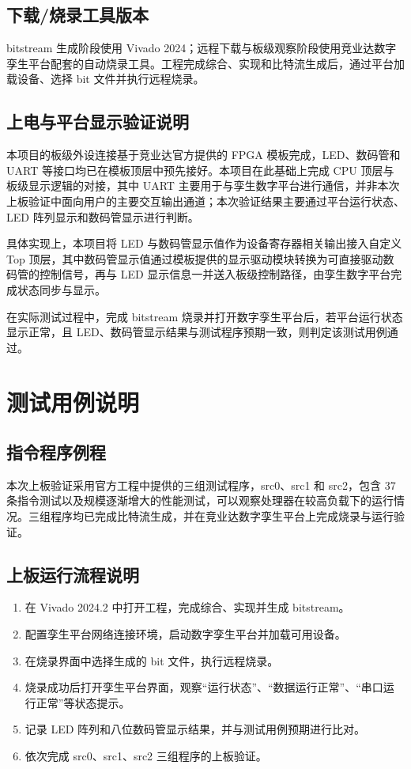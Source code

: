 \documentclass[UTF8,a4paper,12pt]{ctexart}
\begin{document}
\subsection{下载/烧录工具版本}

bitstream 生成阶段使用 Vivado 2024；远程下载与板级观察阶段使用竞业达数字孪生平台配套的自动烧录工具。工程完成综合、实现和比特流生成后，通过平台加载设备、选择 bit 文件并执行远程烧录。

\subsection{上电与平台显示验证说明}

本项目的板级外设连接基于竞业达官方提供的 FPGA 模板完成，LED、数码管和 UART 等接口均已在模板顶层中预先接好。本项目在此基础上完成 CPU 顶层与板级显示逻辑的对接，其中 UART 主要用于与孪生数字平台进行通信，并非本次上板验证中面向用户的主要交互输出通道；本次验证结果主要通过平台运行状态、LED 阵列显示和数码管显示进行判断。

具体实现上，本项目将 LED 与数码管显示值作为设备寄存器相关输出接入自定义 Top 顶层，其中数码管显示值通过模板提供的显示驱动模块转换为可直接驱动数码管的控制信号，再与 LED 显示信息一并送入板级控制路径，由孪生数字平台完成状态同步与显示。

在实际测试过程中，完成 bitstream 烧录并打开数字孪生平台后，若平台运行状态显示正常，且 LED、数码管显示结果与测试程序预期一致，则判定该测试用例通过。

\section{测试用例说明}

\subsection{指令程序例程}

本次上板验证采用官方工程中提供的三组测试程序，src0、src1 和 src2，包含 37 条指令测试以及规模逐渐增大的性能测试，可以观察处理器在较高负载下的运行情况。三组程序均已完成比特流生成，并在竞业达数字孪生平台上完成烧录与运行验证。

\subsection{上板运行流程说明}

\begin{enumerate}[label=\arabic*）]
  \item 在 Vivado 2024.2 中打开工程，完成综合、实现并生成 bitstream。
  \item 配置孪生平台网络连接环境，启动数字孪生平台并加载可用设备。
  \item 在烧录界面中选择生成的 bit 文件，执行远程烧录。
  \item 烧录成功后打开孪生平台界面，观察``运行状态''、``数据运行正常''、``串口运行正常''等状态提示。
  \item 记录 LED 阵列和八位数码管显示结果，并与测试用例预期进行比对。
  \item 依次完成 src0、src1、src2 三组程序的上板验证。
\end{enumerate}
\end{document}
